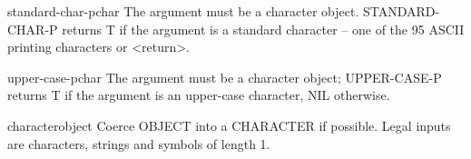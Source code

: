 \begin{function}{standard-char-p}{char}{}{}
  The argument must be a character object. STANDARD-CHAR-P returns T if the
   argument is a standard character -- one of the 95 ASCII printing characters
   or <return>.
\end{function}

\begin{function}{upper-case-p}{char}{}{}
  The argument must be a character object; UPPER-CASE-P returns T if the
   argument is an upper-case character, NIL otherwise.
\end{function}

\begin{class}{character}{object}{}{}
  Coerce OBJECT into a CHARACTER if possible. Legal inputs are
  characters, strings and symbols of length 1.
\end{class}
